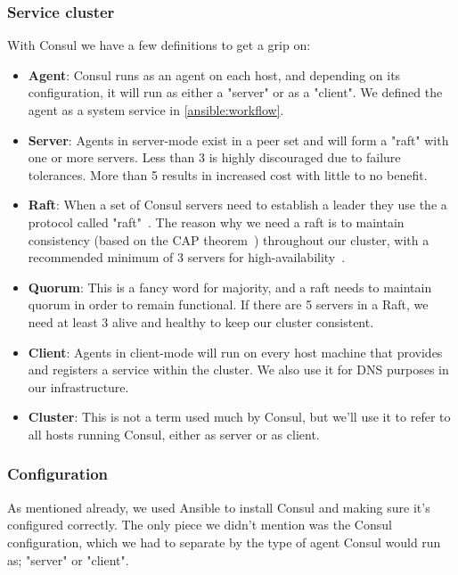             \subsubsection{Service cluster} \label{consul:raft}
                With Consul we have a few definitions to get a grip on:
                \begin{itemize}
                    \item \textbf{Agent}: Consul runs as an agent on each host, and depending on its configuration, it will run as either a "server" or as a "client". We defined the agent as a system service in \ref{ansible:workflow}.
                    \item \textbf{Server}: Agents in server-mode exist in a peer set and will form a "raft" with one or more servers. Less than 3 is highly discouraged due to failure tolerances. More than 5 results in increased cost with little to no benefit.
                    \item \textbf{Raft}: When a set of Consul servers need to establish a leader they use the a protocol called "raft"~\cite{Consul:Raft}. The reason why we need a raft is to maintain consistency (based on the CAP theorem~\cite{CAP}) throughout our cluster, with a recommended minimum of 3 servers for high-availability~\cite{Consul:Consensus}.
                    \item \textbf{Quorum}: This is a fancy word for majority, and a raft needs to maintain quorum in order to remain functional. If there are 5 servers in a Raft, we need at least 3 alive and healthy to keep our cluster consistent. 
                    \item \textbf{Client}: Agents in client-mode will run on every host machine that provides and registers a service within the cluster. We also use it for DNS purposes in our infrastructure.
                    \item \textbf{Cluster}: This is not a term used much by Consul, but we'll use it to refer to all hosts running Consul, either as server or as client.
                \end{itemize}
            
            \subsubsection{Configuration}
                As mentioned already, we used Ansible to install Consul and making sure it's configured correctly. The only piece we didn't mention was the Consul configuration, which we had to separate by the type of agent Consul would run as; "server" or "client".\\
                
